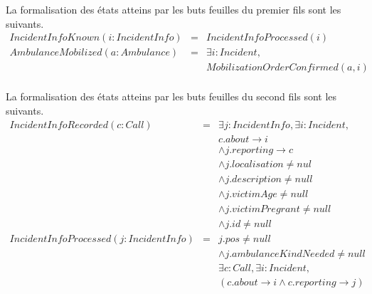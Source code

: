 	
	La formalisation des états atteins par les buts feuilles du premier fils sont
	les suivants.
	\singlespacing
	\begin{equation*}
		\begin{array}{rcl}
			IncidentInfoKnown(i:IncidentInfo)  
			& = & IncidentInfoProcessed(i) \\
			
			AmbulanceMobilized(a: Ambulance) 
			& = & \exists i:Incident, \\
			&   & MobilizationOrderConfirmed(a, i) \\
		\end{array}
	\end{equation*}
	\onehalfspacing
	
	La formalisation des états atteins par les buts feuilles du second fils sont
	les suivants.
	\singlespacing
	\begin{equation*}
		\begin{array}{rcl}
			IncidentInfoRecorded(c:Call)  
			& = & \exists j:IncidentInfo, \exists i:Incident, \\
			&   & c.about \rightarrow i \\
			&   & \wedge j.reporting \rightarrow c \\
			&   & \wedge j.localisation \neq nul \\
			&   & \wedge j.description \neq null \\
			&   & \wedge j.victimAge \neq null \\
			&   & \wedge j.victimPregrant \neq null \\
			&   & \wedge j.id \neq null \\
			
			IncidentInfoProcessed(j:IncidentInfo)  
			& = & j.pos \neq null \\
			&   & \wedge j.ambulanceKindNeeded \neq null \\
			&   & \exists c:Call, \exists i:Incident, \\
			&   & (c.about \rightarrow i \wedge c.reporting \rightarrow j) \\
		\end{array}
	\end{equation*}
	\onehalfspacing
	
